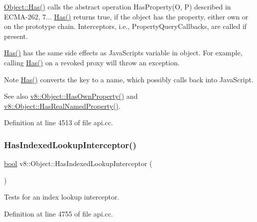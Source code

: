 \mbox{\hyperlink{classv8_1_1Object_a548a8d4329cf890be3698f1bff9b9837}{Object\+::\+Has()}} calls the abstract operation Has\+Property(\+O, P) described in E\+C\+M\+A-\/262, 7... \mbox{\hyperlink{classv8_1_1Object_a548a8d4329cf890be3698f1bff9b9837}{Has()}} returns true, if the object has the property, either own or on the prototype chain. Interceptors, i.\+e., Property\+Query\+Callbacks, are called if present.

\mbox{\hyperlink{classv8_1_1Object_a548a8d4329cf890be3698f1bff9b9837}{Has()}} has the same side effects as Java\+Script\textquotesingle{}s {\ttfamily variable in object}. For example, calling \mbox{\hyperlink{classv8_1_1Object_a548a8d4329cf890be3698f1bff9b9837}{Has()}} on a revoked proxy will throw an exception.

\begin{DoxyNote}{Note}
\mbox{\hyperlink{classv8_1_1Object_a548a8d4329cf890be3698f1bff9b9837}{Has()}} converts the key to a name, which possibly calls back into Java\+Script.
\end{DoxyNote}
See also \mbox{\hyperlink{classv8_1_1Object_acfe461c8e81a3d078d62ece594cb1994}{v8\+::\+Object\+::\+Has\+Own\+Property()}} and \mbox{\hyperlink{classv8_1_1Object_a305a692fa4a571a41755520b6344fa1c}{v8\+::\+Object\+::\+Has\+Real\+Named\+Property()}}. 

Definition at line 4513 of file api.\+cc.

\mbox{\label{classv8_1_1Object_a278913bcd203434870ce5184a538a9af}} 
\subsubsection{\texorpdfstring{Has\+Indexed\+Lookup\+Interceptor()}{HasIndexedLookupInterceptor()}}
{\footnotesize\ttfamily \mbox{\hyperlink{classbool}{bool}} v8\+::\+Object\+::\+Has\+Indexed\+Lookup\+Interceptor (\begin{DoxyParamCaption}{ }\end{DoxyParamCaption})}

Tests for an index lookup interceptor. 

Definition at line 4755 of file api.\+cc.

\mbox{\label{classv8_1_1Object_a1e96fcb9ee17101c0299ec68f2cf8610}} 
